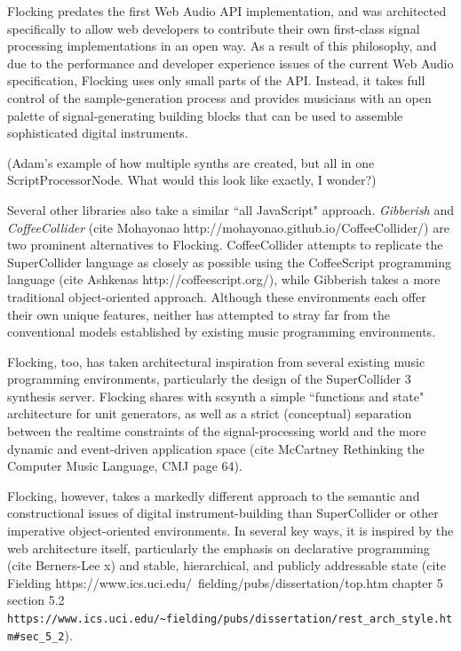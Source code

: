 \documentclass{article}
\begin{document}
Flocking predates the first Web Audio API implementation, and was architected specifically to allow web developers to contribute their own first-class signal processing implementations in an open way. As a result of this philosophy, and due to the performance and developer experience issues of the current Web Audio specification, Flocking uses only small parts of the API. Instead, it takes full control of the sample-generation process and provides musicians with an open palette of signal-generating building blocks that can be used to assemble sophisticated digital instruments.

(Adam's example of how multiple synths are created, but all in one ScriptProcessorNode. What would this look like exactly, I wonder?)

Several other libraries also take a similar ``all JavaScript" approach. {\it Gibberish} \cite{roberts_web_2013} and {\it CoffeeCollider} (cite Mohayonao http://mohayonao.github.io/CoffeeCollider/) are two prominent alternatives to Flocking. CoffeeCollider attempts to replicate the SuperCollider language as closely as possible using the CoffeeScript programming language (cite Ashkenas http://coffeescript.org/), while Gibberish takes a more traditional object-oriented approach. Although these environments each offer their own unique features, neither has attempted to stray far from the conventional models established by existing music programming environments.

Flocking, too, has taken architectural inspiration from several existing music programming environments, particularly the design of the SuperCollider 3 synthesis server. Flocking shares with scsynth a simple ``functions and state" architecture for unit generators, as well as a strict (conceptual) separation between the realtime constraints of the signal-processing world and the more dynamic and event-driven application space (cite McCartney Rethinking the Computer Music Language, CMJ page 64).

Flocking, however, takes a markedly different approach to the semantic and constructional issues of digital instrument-building than SuperCollider or other imperative object-oriented environments. In several key ways, it is inspired by the web architecture itself, particularly the emphasis on declarative programming (cite Berners-Lee x) and stable, hierarchical, and publicly addressable state (cite Fielding https://www.ics.uci.edu/~fielding/pubs/dissertation/top.htm chapter 5 section 5.2 \verb|https://www.ics.uci.edu/~fielding/pubs/dissertation/rest_arch_style.htm#sec_5_2|).
\end{document}
